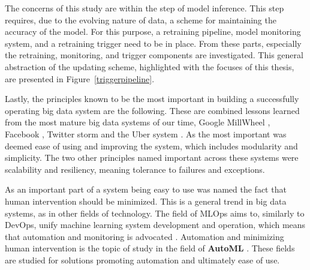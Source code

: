 The concerns of this study are within the step of model inference. This step requires, due to the evolving nature of data, a scheme for maintaining the accuracy of the model. For this purpose, a retraining pipeline, model monitoring system, and a retraining trigger need to be in place. From these parts, especially the retraining, monitoring, and trigger components are investigated. This general abstraction of the updating scheme, highlighted with the focuses of this thesis, are presented in Figure~\ref{triggerpipeline}.

Lastly, the principles known to be the most important in building a successfully operating big data system are the following. These are combined lessons learned from the most mature big data systems of our time, Google MillWheel \cite{millwheel}, Facebook \cite{facebook}, Twitter storm \cite{storm@twitter} and the Uber system \cite{uber}. As the most important was deemed ease of using and improving the system, which includes modularity and simplicity. The two other principles named important across these systems were scalability and resiliency, meaning tolerance to failures and exceptions. 

As an important part of a system being easy to use was named the fact that human intervention should be minimized. This is a general trend in big data systems, as in other fields of technology. The field of MLOps aims to, similarly to DevOps, unify machine learning system development and operation, which means that automation and monitoring is advocated \cite{googlemlops}. Automation and minimizing human intervention is the topic of study in the field of \textbf{AutoML} \cite{celik_adaptation_2021}. These fields are studied for solutions promoting automation and ultimately ease of use.

